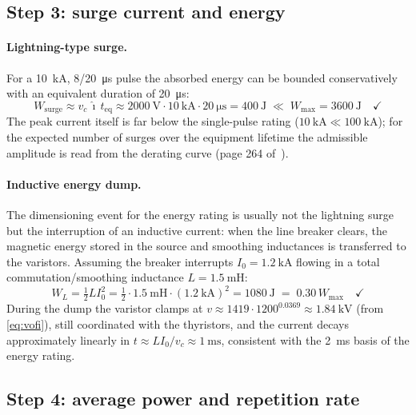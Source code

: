 \documentclass[11pt,a4paper]{article}
\begin{document}
\subsection{Step 3: surge current and energy}

\paragraph{Lightning-type surge.}
For a \SI{10}{\kilo\ampere}, 8/20~\si{\micro\second} pulse the absorbed
energy can be bounded conservatively with an equivalent duration of
\SI{20}{\micro\second}:
%
\begin{equation}
  W_\mathrm{surge} \approx v_c \, \hat\imath \, t_\mathrm{eq}
  \approx \SI{2000}{\volt} \cdot \SI{10}{\kilo\ampere} \cdot
  \SI{20}{\micro\second} = \SI{400}{\joule}
  \;\ll\; W_\mathrm{max} = \SI{3600}{\joule} \quad \checkmark
\end{equation}
%
The peak current itself is far below the single-pulse rating
($\SI{10}{\kilo\ampere} \ll \SI{100}{\kilo\ampere}$); for the expected
number of surges over the equipment lifetime the admissible amplitude is
read from the derating curve (page 264 of~\cite{epcos2002}).

\paragraph{Inductive energy dump.}
The dimensioning event for the energy rating is usually not the lightning
surge but the interruption of an inductive current: when the line breaker
clears, the magnetic energy stored in the source and smoothing inductances
is transferred to the varistors. Assuming the breaker interrupts
$I_0 = \SI{1.2}{\kilo\ampere}$ flowing in a total commutation/smoothing
inductance $L = \SI{1.5}{\milli\henry}$:
%
\begin{equation}
  W_L = \tfrac{1}{2} L I_0^2
      = \tfrac{1}{2}\cdot\SI{1.5}{\milli\henry}\cdot(\SI{1.2}{\kilo\ampere})^2
      = \SI{1080}{\joule}
  \;=\; 0.30\, W_\mathrm{max} \quad \checkmark
\end{equation}
%
During the dump the varistor clamps at
$v \approx 1419\cdot 1200^{0.0369} \approx \SI{1.84}{\kilo\volt}$
(from \eqref{eq:vofi}), still coordinated with the thyristors, and the
current decays approximately linearly in
$t \approx L I_0 / v_c \approx \SI{1}{\milli\second}$, consistent with the
\SI{2}{\milli\second} basis of the energy rating.

\subsection{Step 4: average power and repetition rate}
\end{document}
